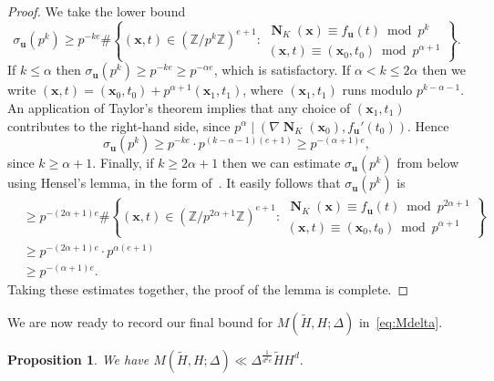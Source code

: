 \documentclass[11pt,letterpaper]{amsart}
\renewcommand{\leq}{\leqslant}
\renewcommand{\geq}{\geqslant}
\newtheorem{proposition}[theorem]{Proposition}
\theoremstyle{definition}
\numberwithin{equation}{section}
\newcommand\ZZ{\mathbb{Z}}
\newcommand{\x}{\mathbf{x}}
\renewcommand{\u}{\mathbf{u}}
\DeclareMathOperator{\nf}{\mathbf{N}}
\newcommand{\0}{\mathbf{0}}
\begin{document}
\begin{proof}
We take the lower bound
$$
\sigma_\u(p^k)\geq p^{-ke}\#\left\{
(\x,t)\in (\ZZ/p^k\ZZ)^{e+1}: 
\begin{array}{l}
\nf_K(\x)\equiv f_\u(t)\bmod{p^k}\\
(\x,t)\equiv (\x_0,t_0) \bmod{p^{\alpha+1}}
\end{array}
\right\}.
$$
If $k\leq \alpha$ then $\sigma_\u(p^k)\geq p^{-ke}\geq p^{-\alpha e}$, which is satisfactory.
If $\alpha< k\leq 2\alpha$ then 
we write  $(\x,t)= (\x_0,t_0)+p^{\alpha+1}(\x_1,t_1)$, where $(\x_1,t_1)$ runs modulo 
$p^{k-\alpha-1}$.  An application of Taylor's theorem implies that 
any choice of $(\x_1,t_1)$ contributes to the right-hand side, since 
 $p^\alpha\mid   (\nabla \nf_K(\x_0), f_\u'(t_0))$. Hence
$$
\sigma_\u(p^k)\geq p^{-ke} \cdot p^{(k-\alpha-1)(e+1)}\geq  p^{-(\alpha+1) e},
$$
since $k\geq \alpha+1$.
Finally, if $k\geq 2\alpha+1$ then 
we can estimate
$\sigma_\u(p^k)$ from below using Hensel's lemma, in the form of~\cite[Lemma 3.3]{nf}. 
It easily follows that $\sigma_\u(p^k)$ is 
\begin{align*}
&\geq p^{-(2\alpha+1)e}
\#\left\{
(\x,t)\in (\ZZ/p^{2\alpha+1}\ZZ)^{e+1}: 
\begin{array}{l}
\nf_K(\x)\equiv f_\u(t)\bmod{p^{2\alpha+1}}\\
(\x,t)\equiv (\x_0,t_0) \bmod{p^{\alpha+1}}
\end{array}
\right\}\\
&\geq p^{-(2\alpha+1)e}\cdot p^{\alpha (e+1)}\\
&\geq  p^{-(\alpha+1)e}.
\end{align*}
Taking these estimates together, the proof of the lemma is complete.
\end{proof}

We are now ready to record our final bound for
$M(\tilde H,H;\Delta)$ in~\eqref{eq:Mdelta}.


\begin{proposition}\label{prop2}
We have 
$
M(\tilde H,H;\Delta)
\ll  \Delta^{\frac{1}{d^2e}}{\tilde H H^{d}}.
$
\end{proposition}
\end{document}
